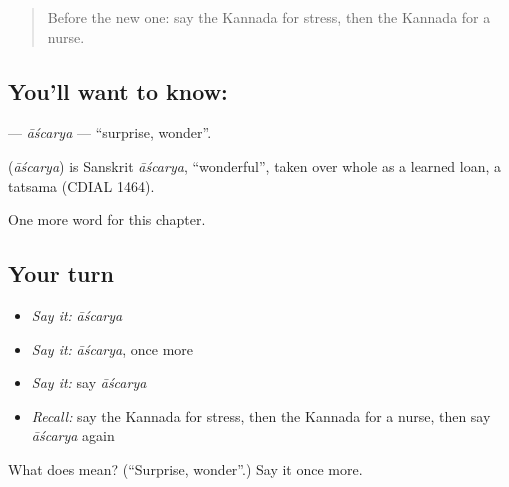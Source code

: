 \label{lesson:KA-C282-ascarya}



\begin{quote}
Before the new one: say the Kannada for stress, then the Kannada for a nurse.
\end{quote}

\subsection*{You'll want to know: }
\textbf{} — \emph{āścarya} — \textquotedblleft{}surprise, wonder\textquotedblright{}.

\begin{cousinweb}
\textbf{} (\emph{āścarya}) is Sanskrit \emph{āścarya}, \textquotedblleft{}wonderful\textquotedblright{}, taken over whole as a learned loan, a tatsama (CDIAL 1464).
\end{cousinweb}

\begin{grammarlens}[title={What you've built}]
One more word for this chapter.
\end{grammarlens}

\subsection*{Your turn}
\begin{itemize}
\raggedright
  \item \emph{Say it:} \emph{āścarya}
  \item \emph{Say it:} \emph{āścarya}, once more
  \item \emph{Say it:} say \emph{āścarya}
  \item \emph{Recall:} say the Kannada for stress, then the Kannada for a nurse, then say \emph{āścarya} again
\end{itemize}

\begin{tcolorbox}[breakable,colback=teal!4,colframe=teal!35!black,title={Before you move on}]
What does  mean? (\textquotedblleft{}Surprise, wonder\textquotedblright{}.) Say it once more.
\end{tcolorbox}
